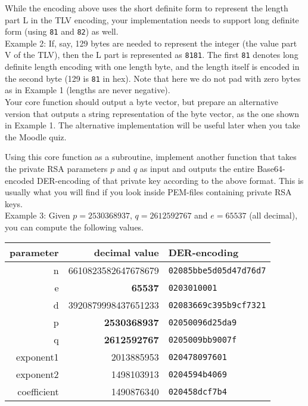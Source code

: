 \documentclass{article}
\begin{document}
\begin{description}
{While the encoding above uses the short definite form to represent the length part L in the TLV encoding, your implementation needs to support long definite form (using \verb!81! and \verb!82!) as well.\\

    Example 2: If, say, 129 bytes are needed to represent the integer (the value part V of the TLV), then the L part is represented as \verb!8181!. The first \verb!81! denotes long definite length encoding with one length byte, and the length itself is encoded in the second byte (129 is \verb!81! in hex). Note that here we do not pad with zero bytes as in Example 1 (lengths are never negative).\\

Your core function should output a byte vector, but prepare an alternative version that outputs a string representation of the byte vector, as the one shown in Example 1. The alternative implementation will be useful later when you take the Moodle quiz.

Using this core function as a subroutine, implement another function that takes the private RSA parameters $p$ and $q$ as input and outputs the entire Base64-encoded DER-encoding of that private key according to the above format. This is usually what you will find if you look inside PEM-files containing private RSA keys.\\

        Example 3: Given $p=2530368937$, $q=2612592767$ and $e=65537$ (all decimal), you can compute the following values.\\
\begin{center}
\begin{tabular}{rrl}
parameter & decimal value & DER-encoding\\\hline
n & 6610823582647678679 & \verb!02085bbe5d05d47d76d7!\\
e & \textbf{65537} & \verb!0203010001!\\
d & 3920879998437651233 & \verb!02083669c395b9cf7321!\\
p & \textbf{2530368937} & \verb!02050096d25da9!\\
q & \textbf{2612592767} & \verb!0205009bb9007f!\\
exponent1 & 2013885953 & \verb!020478097601!\\
exponent2 & 1498103913 & \verb!0204594b4069!\\
coefficient & 1490876340 & \verb!020458dcf7b4!
\end{tabular}
\end{center}

}
\end{description}
\end{document}
